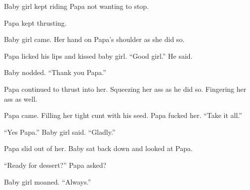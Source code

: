     Baby girl kept riding Papa not wanting to stop.

    Papa kept thrusting.

    Baby girl came. Her hand on Papa’s shoulder as she did so.

    Papa licked his lips and kissed baby girl. “Good girl.” He said.

    Baby nodded. “Thank you Papa.”

    Papa continued to thrust into her. Squeezing her ass as he did so. Fingering her ass as well.

    Papa came. Filling her tight cunt with his seed. Papa fucked her. “Take it all.”

    “Yes Papa.” Baby girl said. “Gladly.”

    Papa slid out of her. Baby sat back down and looked at Papa.

    “Ready for dessert?” Papa asked?

    Baby girl moaned. “Always.”

